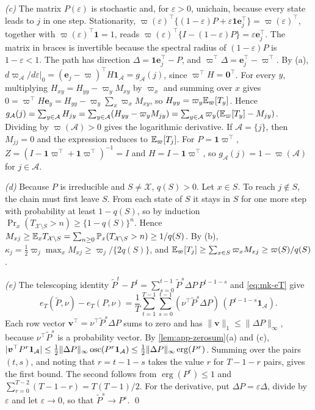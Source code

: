 \emph{(c)} The matrix $P(\varepsilon)$ is stochastic and, for $\varepsilon>0$, unichain, because every state leads to $j$ in one step. Stationarity, $\varpi(\varepsilon)^{\top}\{(1-\varepsilon)P+\varepsilon\bm1\bm e_j^{\top}\}=\varpi(\varepsilon)^{\top}$, together with $\varpi(\varepsilon)^{\top}\bm1=1$, reads $\varpi(\varepsilon)^{\top}\{I-(1-\varepsilon)P\}=\varepsilon\bm e_j^{\top}$. The matrix in braces is invertible because the spectral radius of $(1-\varepsilon)P$ is $1-\varepsilon<1$. The path has direction $\Delta=\bm1\bm e_j^{\top}-P$, and $\varpi^{\top}\Delta=\bm e_j^{\top}-\varpi^{\top}$. By (a), $d\varpi_{\mathcal A}/d\varepsilon|_0=(\bm e_j-\varpi)^{\top}H\bm1_{\mathcal A}=g_{\mathcal A}(j)$, since $\varpi^{\top}H=\bm0^{\top}$. For every $y$, multiplying $H_{xy}=H_{yy}-\varpi_yM_{xy}$ by $\varpi_x$ and summing over $x$ gives $0=\varpi^{\top}H\bm e_y=H_{yy}-\varpi_y\sum_x\varpi_xM_{xy}$, so $H_{yy}=\varpi_y\mathbb{E}_\varpi[T_y]$. Hence $g_{\mathcal A}(j)=\sum_{y\in\mathcal A}H_{jy}=\sum_{y\in\mathcal A}(H_{yy}-\varpi_yM_{jy})=\sum_{y\in\mathcal A}\varpi_y(\mathbb{E}_\varpi[T_y]-M_{jy})$. Dividing by $\varpi(\mathcal A)>0$ gives the logarithmic derivative. If $\mathcal A=\{j\}$, then $M_{jj}=0$ and the expression reduces to $\mathbb{E}_\varpi[T_j]$. For $P=\bm1\varpi^{\top}$, $Z=(I-\bm1\varpi^{\top}+\bm1\varpi^{\top})^{-1}=I$ and $H=I-\bm1\varpi^{\top}$, so $g_{\mathcal A}(j)=1-\varpi(\mathcal A)$ for $j\in\mathcal A$.

\emph{(d)} Because $P$ is irreducible and $S\neq\mathcal X$, $q(S)>0$. Let $x\in S$. To reach $j\notin S$, the chain must first leave $S$. From each state of $S$ it stays in $S$ for one more step with probability at least $1-q(S)$, so by induction $\Pr_x(T_{\mathcal X\setminus S}>n)\ge\{1-q(S)\}^n$. Hence $M_{xj}\ge\mathbb{E}_xT_{\mathcal X\setminus S}=\sum_{n\ge0}\mathbb{P}_x(T_{\mathcal X\setminus S}>n)\ge1/q(S)$. By (b), $\kappa_j=\frac12\varpi_j\max_xM_{xj}\ge\varpi_j/\{2q(S)\}$, and $\mathbb{E}_\varpi[T_j]\ge\sum_{x\in S}\varpi_xM_{xj}\ge\varpi(S)/q(S)$.

\emph{(e)} The telescoping identity $\tilde P^t-P^t=\sum_{s=0}^{t-1}\tilde P^{s}\Delta P\,P^{t-1-s}$ and \eqref{eq:mk-eT} give
\[
  e_T(\tilde P,\nu)-e_T(P,\nu)=\frac1T\sum_{t=1}^{T-1}\sum_{s=0}^{t-1}(\nu^{\top}\tilde P^{s}\Delta P)\,(P^{t-1-s}\bm1_{\mathcal A}).
\]
Each row vector $\bm v^{\top}=\nu^{\top}\tilde P^s\Delta P$ sums to zero and has $\|\bm v\|_1\le\|\Delta P\|_\infty$, because $\nu^{\top}\tilde P^s$ is a probability vector. By \cref{lem:app-zerosum}(a) and (c), $|\bm v^{\top}P^r\bm1_{\mathcal A}|\le\frac12\|\Delta P\|_\infty\operatorname{osc}(P^r\bm1_{\mathcal A})\le\frac12\|\Delta P\|_\infty\operatorname{erg}(P^r)$. Summing over the pairs $(t,s)$, and noting that $r=t-1-s$ takes the value $r$ for $T-1-r$ pairs, gives the first bound. The second follows from $\operatorname{erg}(P^r)\le1$ and $\sum_{r=0}^{T-2}(T-1-r)=T(T-1)/2$. For the derivative, put $\Delta P=\varepsilon\Delta$, divide by $\varepsilon$ and let $\varepsilon\to0$, so that $\tilde P^s\to P^s$. \qed

